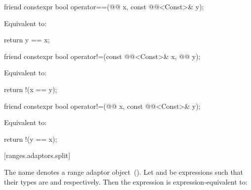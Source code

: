 %
\begin{itemdecl}
friend constexpr bool operator==(@@ x, const @@<Const>& y);
\end{itemdecl}

\begin{itemdescr}
\pnum
\effects Equivalent to:
\begin{codeblock}
return y == x;
\end{codeblock}
\end{itemdescr}

%
\begin{itemdecl}
friend constexpr bool operator!=(const @@<Const>& x, @@ y);
\end{itemdecl}

\begin{itemdescr}
\pnum
\effects Equivalent to:
\begin{codeblock}
return !(x == y);
\end{codeblock}
\end{itemdescr}

%
\begin{itemdecl}
friend constexpr bool operator!=(@@ x, const @@<Const>& y);
\end{itemdecl}

\begin{itemdescr}
\pnum
\effects Equivalent to:
\begin{codeblock}
return !(y == x);
\end{codeblock}
\end{itemdescr}

[ranges.adaptors.split]{}

\pnum
The name  denotes a range adaptor object~().
Let  and  be expressions such that their types are 
and  respectively. Then the expression  is
expression-equivalent to:

